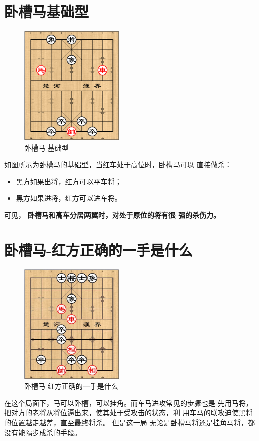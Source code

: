 \documentclass[a5paper,twoside]{book}
\begin{document}
\section{卧槽马基础型}
\label{sec-2-1}
\begin{figure}[H]
\centering
\includegraphics[width=5cm]{pic/卧槽马-基础型.png}
\caption{卧槽马-基础型}
\end{figure}


如图所示为卧槽马的基础型，当红车处于高位时，卧槽马可以
直接做杀：
\begin{itemize}
\item 黑方如果出将，红方可以平车将；
\item 黑方如果进将，红方可以进车将。
\end{itemize}


可见， \textbf{卧槽马和高车分居两翼时，对处于原位的将有很
强的杀伤力。}

\section{卧槽马-红方正确的一手是什么}
\label{sec-2-2}
\begin{figure}[H]
\centering
\includegraphics[width=5cm]{pic/卧槽马-红方正确的一手是什么.png}
\caption{卧槽马-红方正确的一手是什么}
\end{figure}


在这个局面下，马可以卧槽，可以挂角。而车马进攻常见的步骤也是
先用马将，把对方的老将从将位逼出来，使其处于受攻击的状态，利
用车马的联攻迫使黑将的位置越走越差，直至最终将杀。
但是这一局
无论是卧槽马将还是挂角马将，都没有能隔步成杀的手段。
\end{document}
